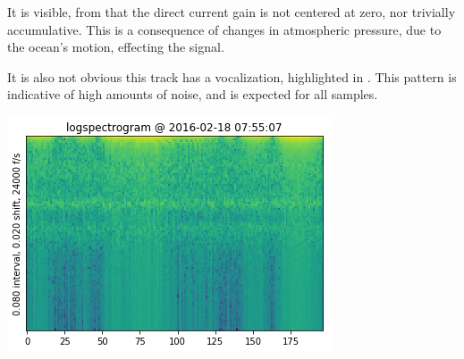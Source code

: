 \documentclass{article}
\newenvironment{Figure}
  {\par\medskip\noindent\minipage{\linewidth}}
  {\endminipage\par\medskip}
\begin{document}
\begin{multicols}{2}
It is visible, from 
that the direct current gain is not centered at zero, nor trivially accumulative. This
is a consequence of changes in atmospheric pressure, due to the ocean's motion,
effecting the signal. %

It is also not obvious this track has a vocalization, highlighted in .
This pattern is indicative of high amounts of noise, and is expected for all samples.

\begin{Figure}
  \includegraphics[width=\columnwidth]{./rawspec.png}
  \label{fig:rawspec}
\end{Figure}



\end{multicols}
\end{document}
